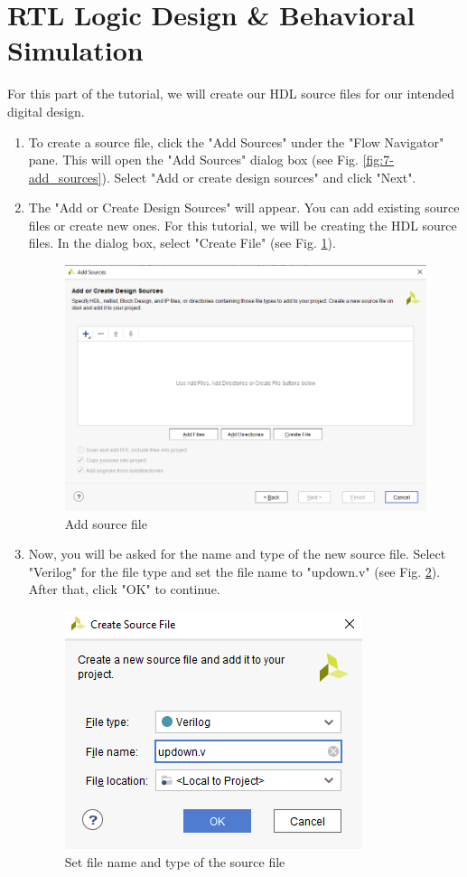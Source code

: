 \documentclass{article}
\begin{document}
\section*{RTL Logic Design \& Behavioral Simulation}
  For this part of the tutorial, we will create our HDL source files for our intended digital design. 
  \begin{enumerate}
    \item To create a source file, click the "Add Sources" under the "Flow Navigator" pane. This will open the "Add Sources" dialog box (see Fig. \ref{fig:7-add_sources}). 
    Select "Add or create design sources" and click "Next".
    \item The "Add or Create Design Sources" will appear. You can add existing source files or create new ones. For this tutorial, we will be creating the HDL source files.
    In the dialog box, select "Create File" (see Fig. \ref{fig:12-add_source}). 
      \begin{figure}[h!]
        \centering
        \includegraphics[width=0.5\linewidth]{img/program/12-add_source.png}
        \caption{Add source file}
        \label{fig:12-add_source}
      \end{figure}

    \item Now, you will be asked for the name and type of the new source file. Select "Verilog" for the file type and set the file name to "updown.v" 
    (see Fig. \ref{fig:13-create_source}). After that, click "OK" to continue.
      \begin{figure}[h!]
        \centering
        \includegraphics[width=0.4\linewidth]{img/program/13-create_source.png}
        \caption{Set file name and type of the source file}
        \label{fig:13-create_source}
      \end{figure}


\end{enumerate}
\end{document}
